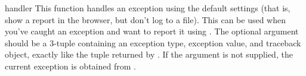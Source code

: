 \begin{funcdesc}{handler}{}
  This function handles an exception using the default settings
  (that is, show a report in the browser, but don't log to a file).
  This can be used when you've caught an exception and want to
  report it using .  The optional  argument
  should be a 3-tuple containing an exception type, exception
  value, and traceback object, exactly like the tuple returned by
  .  If the  argument
  is not supplied, the current exception is obtained from
  .
\end{funcdesc}
